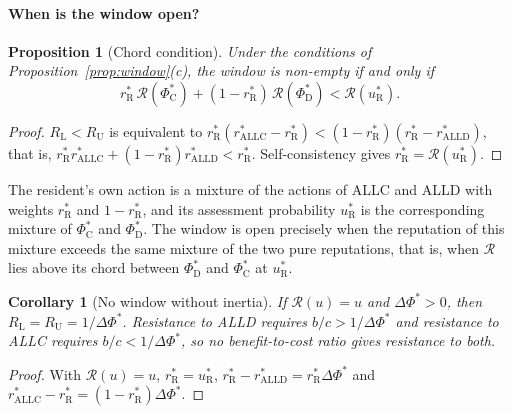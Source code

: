 \documentclass[fleqn,10pt]{wlscirep}
\newcommand{\Rmap}{\mathscr{R}}            %
\newcommand{\rR}{r_{\mathrm{R}}^{*}}
\newcommand{\uR}{u_{\mathrm{R}}^{*}}
\newcommand{\dPhi}{\Delta\Phi^{*}}
\newcommand{\ALLC}{\mathrm{ALLC}}
\newcommand{\ALLD}{\mathrm{ALLD}}
\theoremstyle{plain}
\newtheorem{proposition}[lemma]{Proposition}
\newtheorem{corollary}[lemma]{Corollary}
\begin{document}
\paragraph{When is the window open?}
\begin{proposition}[Chord condition]\label{prop:chord}
Under the conditions of Proposition~\ref{prop:window}(c), the window is non-empty if and only if
\begin{equation}
\rR\,\Rmap(\Phi^*_{\mathrm C})+(1-\rR)\,\Rmap(\Phi^*_{\mathrm D})<\Rmap(\uR).
\label{eq:s-chord}
\end{equation}
\end{proposition}
\begin{proof}
$R_{\mathrm L}<R_{\mathrm U}$ is equivalent to $\rR(r^*_{\ALLC}-\rR)<(1-\rR)(\rR-r^*_{\ALLD})$, that is, $\rR r^*_{\ALLC}+(1-\rR)r^*_{\ALLD}<\rR$. Self-consistency gives $\rR=\Rmap(\uR)$.
\end{proof}

The resident's own action is a mixture of the actions of ALLC and ALLD with weights $\rR$ and $1-\rR$, and its assessment probability $\uR$ is the corresponding mixture of $\Phi^*_{\mathrm C}$ and $\Phi^*_{\mathrm D}$. The window is open precisely when the reputation of this mixture exceeds the same mixture of the two pure reputations, that is, when $\Rmap$ lies above its chord between $\Phi^*_{\mathrm D}$ and $\Phi^*_{\mathrm C}$ at $\uR$.

\begin{corollary}[No window without inertia]\label{cor:nowindow}
If $\Rmap(u)=u$ and $\dPhi>0$, then $R_{\mathrm L}=R_{\mathrm U}=1/\dPhi$. Resistance to ALLD requires $b/c>1/\dPhi$ and resistance to ALLC requires $b/c<1/\dPhi$, so no benefit-to-cost ratio gives resistance to both.
\end{corollary}
\begin{proof}
With $\Rmap(u)=u$, $\rR=\uR$, $\rR-r^*_{\ALLD}=\rR\dPhi$ and $r^*_{\ALLC}-\rR=(1-\rR)\dPhi$.
\end{proof}
\end{document}
